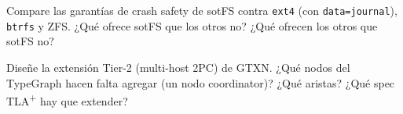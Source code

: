 \begin{ejercicio}[\dificultad{$\star\star\star$}]
\label{ej:tx-11}
Compare las garantías de crash safety de sotFS contra \texttt{ext4}
(con \texttt{data=journal}), \texttt{btrfs} y ZFS. ¿Qué ofrece sotFS
que los otros no? ¿Qué ofrecen los otros que sotFS no?
\end{ejercicio}

\begin{ejercicio}[\dificultad{$\star\star\star$}]
\label{ej:tx-12}
Diseñe la extensión Tier-2 (multi-host 2PC) de GTXN. ¿Qué nodos del
TypeGraph hacen falta agregar (un nodo coordinator)? ¿Qué aristas? ¿Qué
spec TLA\textsuperscript{+} hay que extender?
\end{ejercicio}
